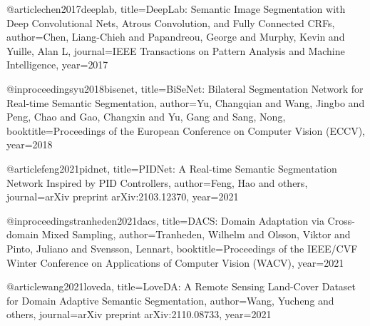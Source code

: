 \documentclass[a4paper,12pt]{article}
\begin{document}


@article{chen2017deeplab,
  title={DeepLab: Semantic Image Segmentation with Deep Convolutional Nets, Atrous Convolution, and Fully Connected CRFs},
  author={Chen, Liang-Chieh and Papandreou, George and Murphy, Kevin and Yuille, Alan L},
  journal={IEEE Transactions on Pattern Analysis and Machine Intelligence},
  year={2017}
}

@inproceedings{yu2018bisenet,
  title={BiSeNet: Bilateral Segmentation Network for Real-time Semantic Segmentation},
  author={Yu, Changqian and Wang, Jingbo and Peng, Chao and Gao, Changxin and Yu, Gang and Sang, Nong},
  booktitle={Proceedings of the European Conference on Computer Vision (ECCV)},
  year={2018}
}

@article{feng2021pidnet,
  title={PIDNet: A Real-time Semantic Segmentation Network Inspired by PID Controllers},
  author={Feng, Hao and others},
  journal={arXiv preprint arXiv:2103.12370},
  year={2021}
}

@inproceedings{tranheden2021dacs,
  title={DACS: Domain Adaptation via Cross-domain Mixed Sampling},
  author={Tranheden, Wilhelm and Olsson, Viktor and Pinto, Juliano and Svensson, Lennart},
  booktitle={Proceedings of the IEEE/CVF Winter Conference on Applications of Computer Vision (WACV)},
  year={2021}
}

@article{wang2021loveda,
  title={LoveDA: A Remote Sensing Land-Cover Dataset for Domain Adaptive Semantic Segmentation},
  author={Wang, Yucheng and others},
  journal={arXiv preprint arXiv:2110.08733},
  year={2021}
}
\end{document}
